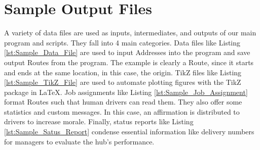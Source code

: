 \documentclass[letterpaper]{article}
\begin{document}
    \appendix
    \section{Sample Output Files}
    \label{appendix:Sample_Output_Files}

    A variety of data files are used as inputs, intermediates, and outputs of our main program and scripts. They fall into 4 main categories. Data files like Listing \ref{lst:Sample_Data_File} are used to input Addresses into the program and save output Routes from the program. The example is clearly a Route, since it starts and ends at the same location, in this case, the origin. TikZ files like Listing \ref{lst:Sample_TikZ_File} are used to automate plotting figures with the TikZ package in \LaTeX . Job assignments like Listing \ref{lst:Sample_Job_Assignment} format Routes such that human drivers can read them. They also offer some statistics and custom messages. In this case, an affirmation is distributed to drivers to increase morale. Finally, status reports like Listing \ref{lst:Sample_Satus_Report} condense essential information like delivery numbers for managers to evaluate the hub's performance.

    

    

    

    

    
    
\end{document}
